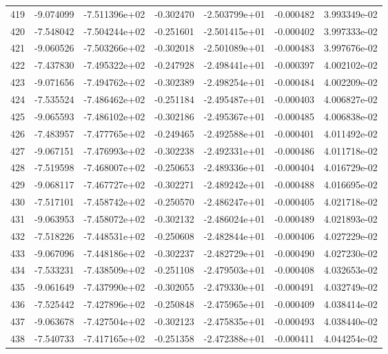 \begin{tabular}{rrrrrrr}
 419 &  -9.074099 & -7.511396e+02 & -0.302470 & -2.503799e+01 &   -0.000482 &  3.993349e-02 \\
 420 &  -7.548042 & -7.504244e+02 & -0.251601 & -2.501415e+01 &   -0.000402 &  3.997333e-02 \\
 421 &  -9.060526 & -7.503266e+02 & -0.302018 & -2.501089e+01 &   -0.000483 &  3.997676e-02 \\
 422 &  -7.437830 & -7.495322e+02 & -0.247928 & -2.498441e+01 &   -0.000397 &  4.002102e-02 \\
 423 &  -9.071656 & -7.494762e+02 & -0.302389 & -2.498254e+01 &   -0.000484 &  4.002209e-02 \\
 424 &  -7.535524 & -7.486462e+02 & -0.251184 & -2.495487e+01 &   -0.000403 &  4.006827e-02 \\
 425 &  -9.065593 & -7.486102e+02 & -0.302186 & -2.495367e+01 &   -0.000485 &  4.006838e-02 \\
 426 &  -7.483957 & -7.477765e+02 & -0.249465 & -2.492588e+01 &   -0.000401 &  4.011492e-02 \\
 427 &  -9.067151 & -7.476993e+02 & -0.302238 & -2.492331e+01 &   -0.000486 &  4.011718e-02 \\
 428 &  -7.519598 & -7.468007e+02 & -0.250653 & -2.489336e+01 &   -0.000404 &  4.016729e-02 \\
 429 &  -9.068117 & -7.467727e+02 & -0.302271 & -2.489242e+01 &   -0.000488 &  4.016695e-02 \\
 430 &  -7.517101 & -7.458742e+02 & -0.250570 & -2.486247e+01 &   -0.000405 &  4.021718e-02 \\
 431 &  -9.063953 & -7.458072e+02 & -0.302132 & -2.486024e+01 &   -0.000489 &  4.021893e-02 \\
 432 &  -7.518226 & -7.448531e+02 & -0.250608 & -2.482844e+01 &   -0.000406 &  4.027229e-02 \\
 433 &  -9.067096 & -7.448186e+02 & -0.302237 & -2.482729e+01 &   -0.000490 &  4.027230e-02 \\
 434 &  -7.533231 & -7.438509e+02 & -0.251108 & -2.479503e+01 &   -0.000408 &  4.032653e-02 \\
 435 &  -9.061649 & -7.437990e+02 & -0.302055 & -2.479330e+01 &   -0.000491 &  4.032749e-02 \\
 436 &  -7.525442 & -7.427896e+02 & -0.250848 & -2.475965e+01 &   -0.000409 &  4.038414e-02 \\
 437 &  -9.063678 & -7.427504e+02 & -0.302123 & -2.475835e+01 &   -0.000493 &  4.038440e-02 \\
 438 &  -7.540733 & -7.417165e+02 & -0.251358 & -2.472388e+01 &   -0.000411 &  4.044254e-02 \\

\end{tabular}
